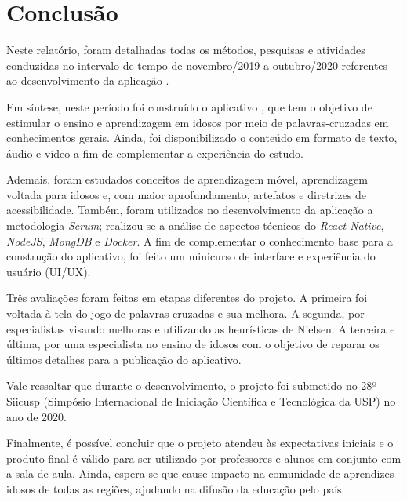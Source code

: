 \chapter{Conclusão} \label{sec:conclusao}
Neste relatório, foram detalhadas todas os métodos, pesquisas e atividades conduzidas no intervalo de tempo de novembro/2019 a outubro/2020 referentes ao desenvolvimento da aplicação \crossword.

Em síntese, neste período foi construído o aplicativo \crossword, que tem o objetivo de estimular o ensino e aprendizagem em idosos por meio de palavras-cruzadas em conhecimentos gerais. Ainda, foi disponibilizado o conteúdo em formato de texto, áudio e vídeo a fim de complementar a experiência do estudo.

Ademais, foram estudados conceitos de aprendizagem móvel, aprendizagem voltada para idosos e, com maior aprofundamento, artefatos e diretrizes de acessibilidade. Também, foram utilizados no desenvolvimento da aplicação \crossword a metodologia \textit{Scrum}; realizou-se a análise de aspectos técnicos do \textit{React Native}, \textit{NodeJS}, \textit{MongDB} e \textit{Docker}. A fim de complementar o conhecimento base para a construção do aplicativo, foi feito um minicurso de interface e experiência do usuário (UI/UX).

Três avaliações foram feitas em etapas diferentes do projeto. A primeira foi voltada à tela do jogo de palavras cruzadas e sua melhora. A segunda, por especialistas visando melhoras e utilizando as heurísticas de Nielsen. A terceira e última, por uma especialista no ensino de idosos com o objetivo de reparar os últimos detalhes para a publicação do aplicativo.

Vale ressaltar que durante o desenvolvimento, o projeto foi submetido no 28º Siicusp (Simpósio Internacional de Iniciação Científica e Tecnológica da USP) no ano de 2020.

Finalmente, é possível concluir que o projeto atendeu às expectativas iniciais e o produto final é válido para ser utilizado por professores e alunos em conjunto com a sala de aula. 
Ainda, espera-se que cause impacto na comunidade de aprendizes idosos de todas as regiões, ajudando na difusão da educação pelo país.
